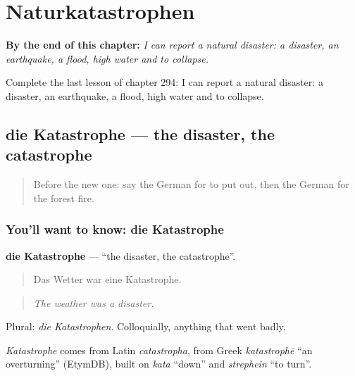 
\chapter{Naturkatastrophen}
\label{ch:ge-naturkatastrophen}

\begin{chapteropening}
\textbf{By the end of this chapter:} \emph{I can report a natural disaster: a disaster, an earthquake, a flood, high water and to collapse.}

Complete the last lesson of chapter 294: I can report a natural disaster: a disaster, an earthquake, a flood, high water and to collapse.
\end{chapteropening}

\section[die Katastrophe]{die Katastrophe — the disaster, the catastrophe}

\label{lesson:GE-C294-katastrophe}



\begin{quote}
Before the new one: say the German for to put out, then the German for the forest fire.
\end{quote}

\subsection*{You'll want to know: die Katastrophe}
\textbf{die Katastrophe} — \textquotedblleft{}the disaster, the catastrophe\textquotedblright{}.

\begin{quote}
Das Wetter war eine Katastrophe.
\end{quote}

\begin{quote}
\emph{The weather was a disaster.}
\end{quote}

Plural: \emph{die Katastrophen}. Colloquially, anything that went badly.

\begin{cousinweb}
\emph{Katastrophe} comes from Latin \emph{catastropha}, from Greek \emph{katastrophē} \textquotedblleft{}an overturning\textquotedblright{} (EtymDB), built on \emph{kata} \textquotedblleft{}down\textquotedblright{} and \emph{strephein} \textquotedblleft{}to turn\textquotedblright{}.
\end{cousinweb}

